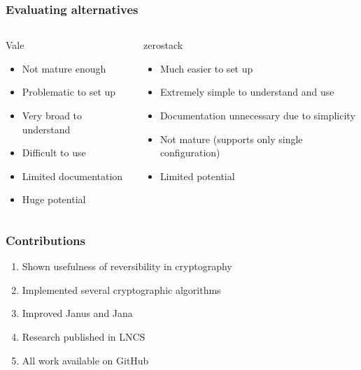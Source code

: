 \documentclass{beamer}
\begin{document}
\addtocounter{page}{1}
\begin{frame}
\addtocounter{page}{-1}
\frametitle{Evaluating alternatives}

\begin{columns}
\pause
\begin{column}{0.5\textwidth}
\begin{block}{Vale}
\begin{itemize}
\item Not mature enough
\item Problematic to set up
\item Very broad to understand
\item Difficult to use
\item Limited documentation
\item Huge potential
\end{itemize}
\end{block}
\end{column}

\pause
\begin{column}{0.5\textwidth}
\begin{block}{zerostack}
\begin{itemize}
\item Much easier to set up
\item Extremely simple to understand and use
\item Documentation unnecessary due to simplicity
\item Not mature (supports only single configuration)
\item Limited potential
\end{itemize}
\end{block}
\end{column}

\end{columns}

\end{frame}



\addtocounter{page}{1}
\begin{frame}
\addtocounter{page}{-1}
\frametitle{Contributions}

\begin{enumerate}

\item Shown usefulness of reversibility in cryptography
\item Implemented several cryptographic algorithms
\item Improved Janus and Jana
\item Research published in LNCS
\item All work available on GitHub

\end{enumerate}

\end{frame}
\end{document}
